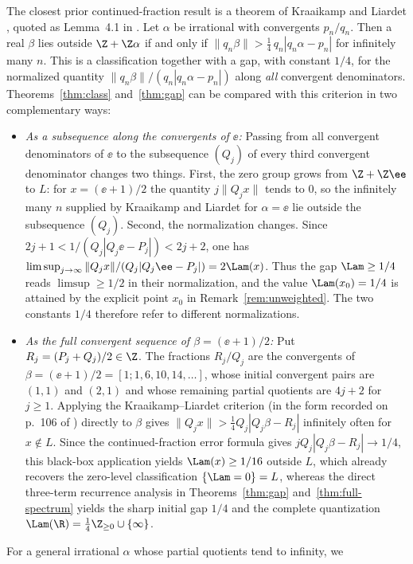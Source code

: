 The closest prior continued-fraction result is a theorem of Kraaikamp and
Liardet \cite{KL}, quoted as Lemma~4.1 in \cite{BDS}. Let $\alpha$ be irrational
with convergents $p_n/q_n$. Then a real $\beta$ lies outside
$\Z+\Z\alpha$ if and only if
$\|q_n\beta\|>\tfrac14\,q_n|q_n\alpha-p_n|$ for infinitely many $n$. This
is a classification together with a gap, with constant $1/4$, for the
normalized quantity $\|q_n\beta\|/(q_n|q_n\alpha-p_n|)$ along \emph{all}
convergent denominators. Theorems~\ref{thm:class} and~\ref{thm:gap} can be
compared with this criterion in two complementary ways:
\begin{itemize}[leftmargin=1.8em]
\item \emph{As a subsequence along the convergents of $\ee$:} Passing from all
convergent denominators of $\ee$ to the subsequence $(Q_j)$ of every third
convergent denominator changes two things. First, the zero group grows from
$\Z+\Z\ee$ to $L$: for $x=(\ee+1)/2$ the quantity $j\|Q_jx\|$ tends to $0$, so
the infinitely many $n$ supplied by Kraaikamp and Liardet for $\alpha=\ee$ lie
outside the subsequence $(Q_j)$. Second, the normalization changes. Since
$2j+1<1/(Q_j|Q_j\ee-P_j|)<2j+2$, one has
$\limsup_{j\to\infty}\|Q_jx\|/(Q_j|Q_j\ee-P_j|)=2\Lam(x)$. Thus the gap
$\Lam\ge1/4$ reads $\limsup\ge1/2$ in their normalization, and the value
$\Lam(x_0)=1/4$ is attained by the explicit point $x_0$ in
Remark~\ref{rem:unweighted}. The two constants $1/4$ therefore refer to
different normalizations.
\item \emph{As the full convergent sequence of $\beta=(\ee+1)/2$:} Put
$R_j=(P_j+Q_j)/2\in\Z$. The fractions $R_j/Q_j$ are the convergents of
$\beta=(\ee+1)/2=[1;1,6,10,14,\dots]$, whose initial convergent pairs are
$(1,1)$ and $(2,1)$ and whose remaining partial quotients are $4j+2$ for
$j\ge1$. Applying the Kraaikamp--Liardet criterion \cite{KL} (in the form
recorded on p.~106 of \cite{BDS}) directly to $\beta$ gives
$\|Q_jx\|>\tfrac14 Q_j|Q_j\beta-R_j|$ infinitely often for $x\notin L$. Since
the continued-fraction error formula gives $jQ_j|Q_j\beta-R_j|\to1/4$, this
black-box application yields $\Lam(x)\ge1/16$ outside $L$, which already
recovers the zero-level classification $\{\Lam=0\}=L$, whereas the direct
three-term recurrence analysis in Theorems~\ref{thm:gap}
and~\ref{thm:full-spectrum} yields the sharp initial gap $1/4$ and the complete
quantization $\Lam(\R)=\frac14\Z_{\ge0}\cup\{\infty\}$.
\end{itemize}
For a general irrational $\alpha$ whose partial quotients tend to infinity, we
